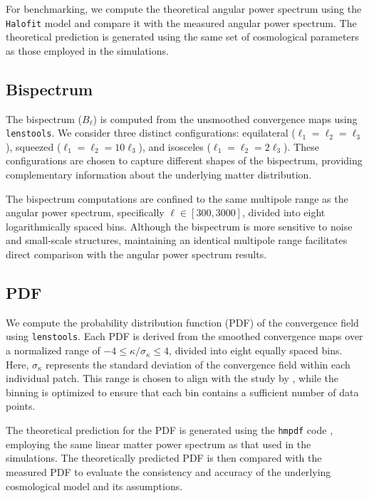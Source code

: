 For benchmarking, we compute the theoretical angular power spectrum using the \texttt{Halofit} model \citep{2012ApJ...761..152T} and compare it with the measured angular power spectrum. The theoretical prediction is generated using the same set of cosmological parameters as those employed in the simulations.

\subsection{Bispectrum}
The bispectrum ($B_{\ell}$) is computed from the unsmoothed convergence maps using \texttt{lenstools}. We consider three distinct configurations: equilateral ($\ell_1 = \ell_2 = \ell_3$), squeezed ($\ell_1 = \ell_2 = 10\ell_3$), and isosceles ($\ell_1 = \ell_2 = 2\ell_3$). These configurations are chosen to capture different shapes of the bispectrum, providing complementary information about the underlying matter distribution.

The bispectrum computations are confined to the same multipole range as the angular power spectrum, specifically $\ell \in [300, 3000]$,  divided into eight logarithmically spaced bins. Although the bispectrum is more sensitive to noise and small-scale structures, maintaining an identical multipole range facilitates direct comparison with the angular power spectrum results.


\subsection{PDF}
We compute the probability distribution function (PDF) of the convergence field using \texttt{lenstools}. Each PDF is derived from the smoothed convergence maps over a normalized range of $-4 \leq \kappa/\sigma_{\kappa} \leq 4$, divided into eight equally spaced bins. Here, $\sigma_{\kappa}$ represents the standard deviation of the convergence field within each individual patch. This range is chosen to align with the study by \citet{2023arXiv230405928T}, while the binning is optimized to ensure that each bin contains a sufficient number of data points.

The theoretical prediction for the PDF is generated using the \texttt{hmpdf} code \citep{2020PhRvD.102l3545T}, employing the same linear matter power spectrum as that used in the simulations. The theoretically predicted PDF is then compared with the measured PDF to evaluate the consistency and accuracy of the underlying cosmological model and its assumptions.

